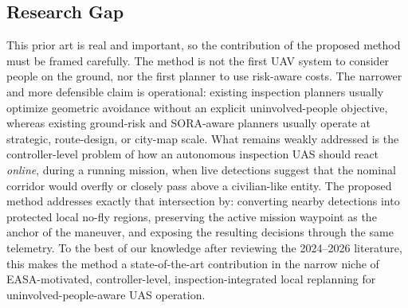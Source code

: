 \documentclass[a4paper,11pt]{article}
\begin{document}
\subsection{Research Gap}

This prior art is real and important, so the contribution of the proposed method must be framed carefully. The method is not the first UAV system to consider people on the ground, nor the first planner to use risk-aware costs. The narrower and more defensible claim is operational: existing inspection planners usually optimize geometric avoidance without an explicit uninvolved-people objective, whereas existing ground-risk and SORA-aware planners usually operate at strategic, route-design, or city-map scale. What remains weakly addressed is the controller-level problem of how an autonomous inspection UAS should react \emph{online}, during a running mission, when live detections suggest that the nominal corridor would overfly or closely pass above a civilian-like entity. The proposed method addresses exactly that intersection by: converting nearby detections into protected local no-fly regions, preserving the active mission waypoint as the anchor of the maneuver, and exposing the resulting decisions through the same telemetry. To the best of our knowledge after reviewing the 2024--2026 literature, this makes the method a state-of-the-art contribution in the narrow niche of EASA-motivated, controller-level, inspection-integrated local replanning for uninvolved-people-aware UAS operation.
\end{document}
